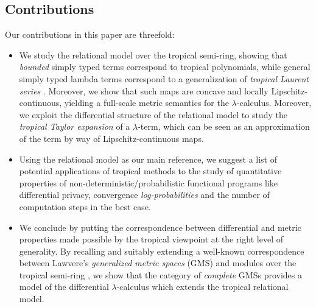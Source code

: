 \subsection{Contributions}

Our contributions in this paper are threefold:
\begin{itemize}

\item We study the relational model over the tropical semi-ring, showing that
\emph{bounded} simply typed terms correspond to tropical polynomials, while general
 simply typed lambda terms correspond to a generalization of \emph{tropical Laurent series} \cite{}. Moreover, we show that such maps are concave and locally Lipschitz-continuous, yielding a full-scale metric semantics for the $\lambda$-calculus.
Moreover, we exploit the differential structure of the relational model to study the \emph{tropical Taylor expansion} of a $\lambda$-term, which can be seen as an approximation of the term by way of Lipschitz-continuous maps.


\item Using the relational model as our main reference, we suggest a list of potential applications of tropical methods to the study of quantitative properties of non-deterministic/probabilistic functional programs like differential privacy, convergence \emph{log-probabilities} and the number of computation steps in the best case.

\item We conclude by putting the correspondence between differential and metric properties made possible by the tropical viewpoint at the right level of generality. 
By recalling and suitably extending a well-known correspondence between Lawvere's \emph{generalized metric spaces} (GMS) \cite{} and modules over the tropical semi-ring \cite{}, we show that the category of \emph{complete}  GMSs provides a model of the differential $\lambda$-calculus which extends the tropical relational model.
\end{itemize}
%
%
%
%
%
%
%
%
%


